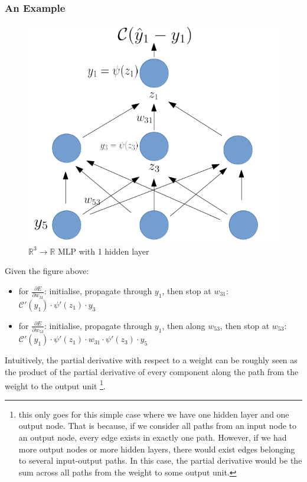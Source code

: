 \documentclass[a4paper,11pt]{article}
\begin{document}
\subsubsection{An Example}

\begin{figure}[h!]
	\centering
	\includegraphics[scale=0.4]{images/gradient_propagates.png}
	\caption{$\mathbb{R}^3 \rightarrow \mathbb{R}$ MLP with 1 hidden layer}
    \label{f26}
\end{figure}

Given the figure above:
\begin{itemize}
\renewcommand\labelitemi{--}
\item for $\frac{\partial{E}}{\partial{w_{31}}}$: initialise, propagate through $y_1$, then stop at $w_{31}$:
 $ \mathcal{\mathcal{C}}'(y_1) \cdot \psi'(z_1) \cdot y_3$ 
\item for $\frac{\partial{E}}{\partial{w_{53}}}$: initialise, propagate through $y_1$, then along $w_{53}$, then stop at $w_{53}$: \\
 $\mathcal{C}'(y_{1}) \cdot \psi'(z_1) \cdot w_{31} \cdot \psi'(z_3) \cdot y_5$ \\
\end{itemize}

Intuitively, the partial derivative with respect to a weight can be roughly seen as the product of the partial derivative of every component along the path from the weight to the output unit \footnote{this only goes for this simple case where we have one hidden layer and one output node. That is because, if we consider all paths from an input node to an output node, every edge exists in exactly one path. However, if we had more output nodes or more hidden layers, there would exist edges belonging to several input-output paths. In this case, the partial derivative would be the sum across all paths from the weight to some output unit.}. \\
\end{document}
